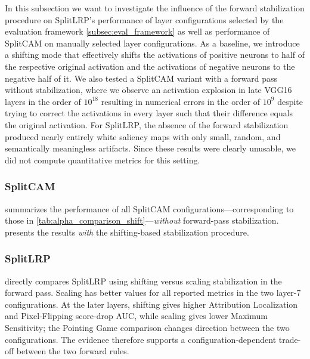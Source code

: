 In this subsection we want to investigate the influence of the forward stabilization procedure on SplitLRP's performance of layer configurations selected by the evaluation framework \cref{subsec:eval_framework} as well as performance of SplitCAM on manually selected layer configurations.
As a baseline, we introduce a shifting mode that effectively shifts the activations of positive neurons to half of the respective original activation and the activations of negative neurons to the negative half of it.
We also tested a SplitCAM variant with a forward pass without stabilization, where we observe an activation explosion in late VGG16 layers in the order of $10^{18}$ resulting in numerical errors in the order of $10^9$ despite trying to correct the activations in every layer such that their difference equals the original activation.
For SplitLRP, the absence of the forward stabilization produced nearly entirely white saliency maps with only small, random, and semantically meaningless artifacts. Since these results were clearly unusable, we did not compute quantitative metrics for this setting.

\subsubsection{SplitCAM}

 summarizes the performance of all SplitCAM configurations---corresponding to those in \cref{tab:alpha_comparison_shift}---\emph{without} forward-pass stabilization.
 presents the results \emph{with} the shifting-based stabilization procedure.

\subsubsection{SplitLRP}

 directly compares SplitLRP using shifting versus scaling stabilization in the forward pass.
Scaling has better values for all reported metrics in the two layer-7 configurations. At the
later layers, shifting gives higher Attribution Localization and Pixel-Flipping score-drop AUC,
while scaling gives lower Maximum Sensitivity; the Pointing Game comparison changes direction
between the two configurations. The evidence therefore supports a configuration-dependent
trade-off between the two forward rules.





